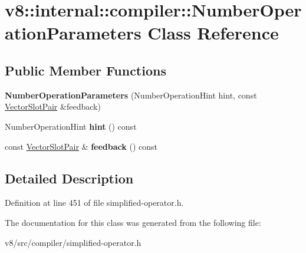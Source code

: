 \hypertarget{classv8_1_1internal_1_1compiler_1_1NumberOperationParameters}{}\section{v8\+:\+:internal\+:\+:compiler\+:\+:Number\+Operation\+Parameters Class Reference}
\label{classv8_1_1internal_1_1compiler_1_1NumberOperationParameters}
\subsection*{Public Member Functions}
\begin{DoxyCompactItemize}
\item 
\mbox{\label{classv8_1_1internal_1_1compiler_1_1NumberOperationParameters_af38d3e08e86a935b60431a59557b1114}} 
{\bfseries Number\+Operation\+Parameters} (Number\+Operation\+Hint hint, const \mbox{\hyperlink{classv8_1_1internal_1_1VectorSlotPair}{Vector\+Slot\+Pair}} \&feedback)
\item 
\mbox{\label{classv8_1_1internal_1_1compiler_1_1NumberOperationParameters_a05cfafe5a82924431f8c8644b563c8cd}} 
Number\+Operation\+Hint {\bfseries hint} () const
\item 
\mbox{\label{classv8_1_1internal_1_1compiler_1_1NumberOperationParameters_a378e72462cde7a30919c1a732eb34c65}} 
const \mbox{\hyperlink{classv8_1_1internal_1_1VectorSlotPair}{Vector\+Slot\+Pair}} \& {\bfseries feedback} () const
\end{DoxyCompactItemize}


\subsection{Detailed Description}


Definition at line 451 of file simplified-\/operator.\+h.



The documentation for this class was generated from the following file\+:\begin{DoxyCompactItemize}
\item 
v8/src/compiler/simplified-\/operator.\+h\end{DoxyCompactItemize}
